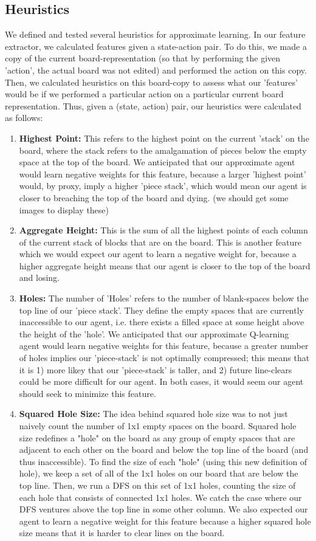 \documentclass[11pt]{article}
\begin{document}
\subsection{Heuristics}
We defined and tested several heuristics for approximate learning. In our feature extractor, we calculated features given a state-action pair. To do this, we made a copy of the current board-representation (so that by performing the given 'action', the actual board was not edited) and performed the action on this copy. Then, we calculated heuristics on this board-copy to assess what our 'features' would be if we performed a particular action on a particular current board representation. Thus, given a (state, action) pair, our heuristics  were calculated as follows:
\begin{enumerate}
    \item \textbf{Highest Point:}
    This refers to the highest point on the current 'stack' on the board, where the stack refers to the amalgamation of pieces below the empty space at the top of the board. We anticipated that our approximate agent would learn negative weights for this feature, because a larger 'highest point' would, by proxy, imply a higher 'piece stack', which would mean our agent is closer to breaching the top of the board and dying. (we should get some images to display these)
    \item \textbf{Aggregate Height:}
    This is the sum of all the highest points of each column of the current stack of blocks that are on the board. This is another feature which we would expect our agent to learn a negative weight for, because a higher aggregate height means that our agent is closer to the top of the board and losing.
    \item \textbf{Holes:}
    The number of 'Holes' refers to the number of blank-spaces below the top line of our 'piece stack'. They define the empty spaces that are currently inaccessible to our agent, i.e. there exists a filled space at some height above the height of the 'hole'. We anticipated that our approximate Q-learning agent would learn negative weights for this feature, because a greater number of holes implies our 'piece-stack' is not optimally compressed; this means that it is 1) more likey that our 'piece-stack' is taller, and 2) future line-clears could be more difficult for our agent. In both cases, it would seem our agent should seek to minimize this feature.
    \item \textbf{Squared Hole Size:}
    The idea behind squared hole size was to not just naively count the number of 1x1 empty spaces on the board. Squared hole size redefines a "hole" on the board as any group of empty spaces that are adjacent to each other on the board and below the top line of the board (and thus inaccessible). To find the size of each "hole" (using this new definition of hole), we keep a set of all of the 1x1 holes on our board that are below the top line. Then, we run a DFS on this set of 1x1 holes, counting the size of each hole that consists of connected 1x1 holes. We catch the case where our DFS ventures above the top line in some other column. We also expected our agent to learn a negative weight for this feature because a higher squared hole size means that it is harder to clear lines on the board.

\end{enumerate}
\end{document}
